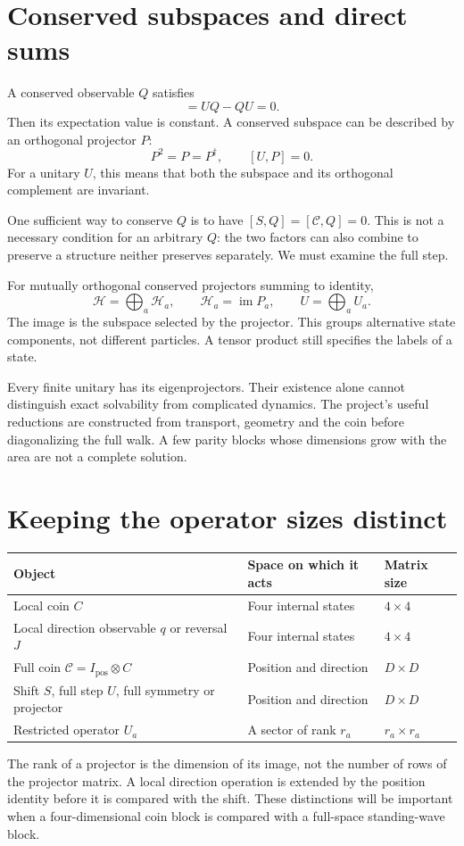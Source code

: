 \documentclass[11pt,a4paper,oneside]{report}
\newcommand{\HH}{\mathcal H}
\newcommand{\CC}{\mathcal C}
\newcommand{\Id}{I}
\numberwithin{equation}{chapter}
\begin{document}
\section{Conserved subspaces and direct sums}
A conserved observable \(Q\) satisfies
\begin{equation}
[U,Q]=UQ-QU=0.
\end{equation}
Then its expectation value is constant. A conserved subspace can be
described by an orthogonal projector \(P\):
\begin{equation}
P^2=P=P^\dagger,\qquad [U,P]=0.
\end{equation}
For a unitary \(U\), this means that both the subspace and its
orthogonal complement are invariant.

One sufficient way to conserve \(Q\) is to have
\([S,Q]=[\CC,Q]=0\). This is not a necessary condition for an
arbitrary \(Q\): the two factors can also combine to preserve a
structure neither preserves separately. We must examine the full step.

For mutually orthogonal conserved projectors summing to identity,
\[
\HH=\bigoplus_a\HH_a,\qquad
\HH_a=\operatorname{im}P_a,\qquad U=\bigoplus_a U_a.
\]
The image is the subspace selected by the projector. This groups
alternative state components, not different particles. A tensor product
still specifies the labels of a state.

Every finite unitary has its eigenprojectors. Their existence alone
cannot distinguish exact solvability from complicated dynamics. The
project's useful reductions are constructed from transport, geometry
and the coin before diagonalizing the full walk. A few parity blocks
whose dimensions grow with the area are not a complete solution.

\section{Keeping the operator sizes distinct}

\begin{center}\small
\begin{tabularx}{\textwidth}{@{}lYY@{}}\toprule
Object & Space on which it acts & Matrix size\\\midrule
Local coin \(C\) & Four internal states & \(4\times4\)\\
Local direction observable \(q\) or reversal \(J\) & Four internal states & \(4\times4\)\\
Full coin \(\CC=\Id_{\mathrm{pos}}\otimes C\) & Position and direction & \(D\times D\)\\
Shift \(S\), full step \(U\), full symmetry or projector & Position and direction & \(D\times D\)\\
Restricted operator \(U_a\) & A sector of rank \(r_a\) & \(r_a\times r_a\)\\\bottomrule
\end{tabularx}
\end{center}
The rank of a projector is the dimension of its image, not the number
of rows of the projector matrix. A local direction operation is extended
by the position identity before it is compared with the shift. These
distinctions will be important when a four-dimensional coin block is
compared with a full-space standing-wave block.
\end{document}
